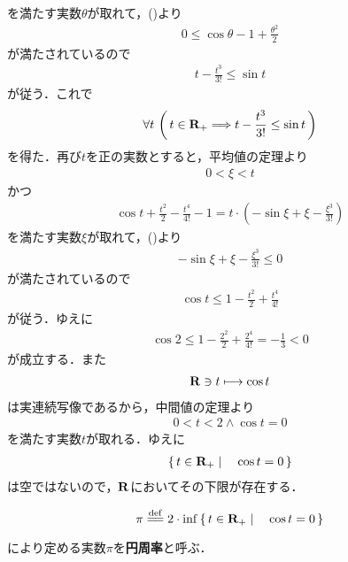 	を満たす実数$\theta$が取れて，()より
	\begin{align}
		0 \leq \cos{\theta} - 1 + \frac{\theta^2}{2}
	\end{align}
	が満たされているので
	\begin{align}
		t - \frac{t^3}{3!} \leq \sin{t}
	\end{align}
	が従う．これで
	\begin{align}
		\forall t\, \left(\, t \in \mathbf{R}_{+} 
		\Longrightarrow t - \frac{t^3}{3!} \leq \sin{t}\, \right)
		\label{fom:existence_of_pi_3}
	\end{align}
	を得た．再び$t$を正の実数とすると，平均値の定理より
	\begin{align}
		0 < \xi < t
	\end{align}
	かつ
	\begin{align}
		\cos{t} + \frac{t^2}{2} - \frac{t^4}{4!} - 1 = t \cdot \left(-\sin{\xi} + \xi - \frac{\xi^3}{3!}\right)
	\end{align}
	を満たす実数$\xi$が取れて，()より
	\begin{align}
		-\sin{\xi} + \xi - \frac{\xi^3}{3!} \leq 0
	\end{align}
	が満たされているので
	\begin{align}
		\cos{t} \leq 1 - \frac{t^2}{2} + \frac{t^4}{4!}
	\end{align}
	が従う．ゆえに
	\begin{align}
		\cos{2} \leq 1 - \frac{2^2}{2} + \frac{2^4}{4!} = -\frac{1}{3} < 0
	\end{align}
	が成立する．また
	\begin{align}
		\mathbf{R} \ni t \longmapsto \cos{t}
	\end{align}
	は実連続写像であるから，中間値の定理より
	\begin{align}
		0 < t < 2 \wedge \cos{t} = 0
	\end{align}
	を満たす実数$t$が取れる．ゆえに
	\begin{align}
		\left\{\, t \in \mathbf{R}_+ \mid \quad \cos{t} = 0\, \right\}
	\end{align}
	は空ではないので，$\mathbf{R}$においてその下限が存在する．
	
	\begin{screen}
		\begin{dfn}[円周率]
			\begin{align}
				\pi \defeq 2 \cdot \inf{}{\Set{t \in \R_+}{\cos{t} = 0}}
			\end{align}
			により定める実数$\pi$を{\bf 円周率}と呼ぶ．
		\end{dfn}
	\end{screen}
	
